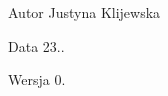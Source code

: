 \begin{DoxyAuthor}{Autor}
Justyna Klijewska 
\end{DoxyAuthor}
\begin{DoxyDate}{Data}
23.. 
\end{DoxyDate}
\begin{DoxyVersion}{Wersja}
0. 
\end{DoxyVersion}
